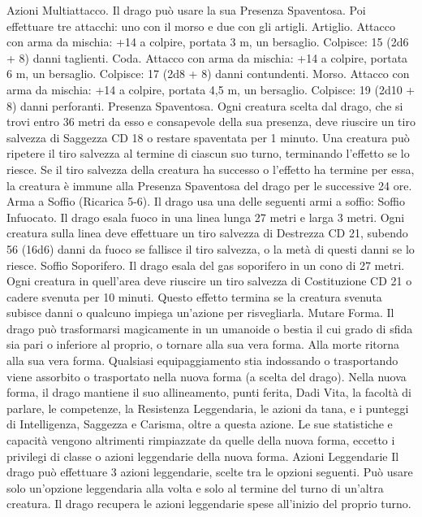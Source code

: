 \begin{multicols}{2}
Azioni
Multiattacco. Il drago può usare la sua Presenza Spaventosa. Poi
effettuare tre attacchi: uno con il morso e due con gli artigli.
Artiglio. Attacco con arma da mischia: +14 a colpire, portata 3
m, un bersaglio.
Colpisce: 15 (2d6 + 8) danni taglienti.
Coda. Attacco con arma da mischia: +14 a colpire, portata 6 m,
un bersaglio.
Colpisce: 17 (2d8 + 8) danni contundenti.
Morso. Attacco con arma da mischia: +14 a colpire, portata 4,5
m, un bersaglio.
Colpisce: 19 (2d10 + 8) danni perforanti.
Presenza Spaventosa. Ogni creatura scelta dal drago, che si trovi
entro 36 metri da esso e consapevole della sua presenza, deve
riuscire un tiro salvezza di Saggezza CD 18 o restare spaventata per
1 minuto. Una creatura può ripetere il tiro salvezza al termine di
ciascun suo turno, terminando l’effetto se lo riesce. Se il tiro salvezza
della creatura ha successo o l’effetto ha termine per essa, la creatura è
immune alla Presenza Spaventosa del drago per le successive 24 ore.
Arma a Soffio (Ricarica 5-6). Il drago usa una delle seguenti armi
a soffio:
Soffio Infuocato. Il drago esala fuoco in una linea lunga 27 metri e
larga 3 metri. Ogni creatura sulla linea deve effettuare un tiro
salvezza di Destrezza CD 21, subendo 56 (16d6) danni da fuoco se
fallisce il tiro salvezza, o la metà di questi danni se lo riesce.
Soffio Soporifero. Il drago esala del gas soporifero in un cono di 27
metri. Ogni creatura in quell’area deve riuscire un tiro salvezza di
Costituzione CD 21 o cadere svenuta per 10 minuti. Questo effetto
termina se la creatura svenuta subisce danni o qualcuno impiega
un’azione per risvegliarla.
Mutare Forma. Il drago può trasformarsi magicamente in un
umanoide o bestia il cui grado di sfida sia pari o inferiore al proprio,
o tornare alla sua vera forma. Alla morte ritorna alla sua vera forma.
Qualsiasi equipaggiamento stia indossando o trasportando viene
assorbito o trasportato nella nuova forma (a scelta del drago).
Nella nuova forma, il drago mantiene il suo allineamento, punti
ferita, Dadi Vita, la facoltà di parlare, le competenze, la Resistenza
Leggendaria, le azioni da tana, e i punteggi di Intelligenza, Saggezza
e Carisma, oltre a questa azione. Le sue statistiche e capacità
vengono altrimenti rimpiazzate da quelle della nuova forma, eccetto i
privilegi di classe o azioni leggendarie della nuova forma.
Azioni Leggendarie
Il drago può effettuare 3 azioni leggendarie, scelte tra le opzioni
seguenti. Può usare solo un’opzione leggendaria alla volta e solo
al termine del turno di un’altra creatura. Il drago recupera le
azioni leggendarie spese all’inizio del proprio turno.

\end{multicols}
